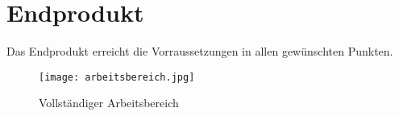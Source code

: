 \section{Endprodukt}

Das Endprodukt erreicht die Vorraussetzungen in allen gewünschten Punkten.

\begin{figure}[H]
    \begin{center}
        \texttt{[image: arbeitsbereich.jpg]}
        \caption{Vollständiger Arbeitsbereich}
    \end{center}
\end{figure}